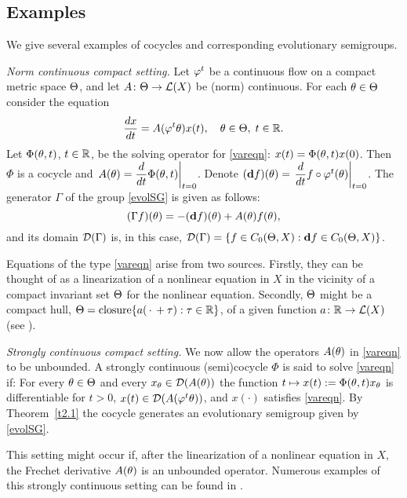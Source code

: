 \subsection{Examples}

We give several examples of cocycles and corresponding
evolutionary semigroups.

\begin{exmp} {\it Norm continuous compact setting.}
Let $\varphi^t$ be a continuous flow on a compact metric space $\Theta$,
and let $A\colon \Theta\to {\cal{L}}(X)$ be (norm) continuous. For each
$\theta\in\Theta$ consider the equation \begin{equation}\label{vareqn}
\dfrac{dx}{dt}=A(\varphi^t\theta)x(t),
\quad \theta\in \Theta,\; t\in{\Bbb{R}}.
\end{equation}
Let $\Phi(\theta,t)$, $t\in{\Bbb{R}}$, be the solving operator for
\eqref{vareqn}: $x(t)=\Phi(\theta,t)x(0)$.
Then $\Phi$ is a cocycle
and $\displaystyle{\left.A(\theta)=\frac{d}{dt}\Phi(\theta,t)\right|_{t=0}}$.
Denote
$(\text{{\bf d}} f)(\theta)=\left.\dfrac{d}{dt}f\circ\varphi^t(\theta)\right|_{t=0}$.
The generator $\Gamma$ of the group \eqref{evolSG} is given as
follows: \begin{equation}\label{genucc}
 (\Gamma f)(\theta)  =
-(\text{{\bf d}} f)(\theta)+A(\theta)f(\theta),
\end{equation}
and its domain
${\cal{D}}(\Gamma)$ is, in this case,
${\cal{D}}(\Gamma)  =
\{f\in C_0(\Theta,X):\text{{\bf d}} f\in C_0(\Theta,X)\}$.

Equations of the type \eqref{vareqn} arise from
two sources. Firstly, they can be thought of as a linearization of a
nonlinear equation in $X$ in the vicinity of a compact invariant
set $\Theta$ for the nonlinear equation.
Secondly, $\Theta$ might be a compact hull,
$\Theta=\text{closure}\{a(\,\cdot\,+\tau): \tau\in{\Bbb{R}}\}$, of a given
function $a\colon{\Bbb{R}}\to {\cal{L}}(X)$ (see \cite{Hale,SSDich}).
\end{exmp}

\begin{exmp} {\it Strongly continuous compact setting.}
We now allow the operators $A(\theta)$ in \eqref{vareqn} to be
unbounded. A strongly continuous (semi)cocycle $\Phi$
is said to solve \eqref{vareqn} if: For every $\theta\in \Theta$ and every
$x_\theta\in{\cal{D}}(A(\theta))$ the function $t\mapsto x(t):=\Phi(\theta,t)x_\theta$
is differentiable for $t>0$, $x(t)\in{\cal{D}}(A(\varphi^t\theta))$, and
$x(\cdot)$ satisfies \eqref{vareqn}. By Theorem~\ref{t2.1} the cocycle
generates an evolutionary semigroup given by \eqref{evolSG}.

This setting might occur if, after the
linearization of a nonlinear equation in $X$, the Frechet derivative
$A(\theta)$ is an unbounded operator. Numerous examples of this
strongly continuous setting can be found in \cite{ChLe1}.
\end{exmp}

